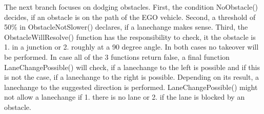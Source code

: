 The next branch focuses on dodging obstacles. First, the condition NoObstacle() decides, if an obstacle is on the path of the EGO vehicle. Second, a threshold of 50\% in ObstacleNotSlower() declares, if a lanechange makes sense. Third, the ObstacleWillResolve() function has the responsibility to check, it the obstacle is 1. in a junction or 2. roughly at a 90 degree angle. In both cases no takeover will be performed. In case all of the 3 functions return false, a final function LaneChangePossible() will check, if a lanechange to the left is possible and if this is not the case, if a lanechange to the right is possible. Depending on its result, a lanechange to the suggested direction is performed. LaneChangePossible() might not allow a lanechange if 1. there is no lane or 2. if the lane is blocked by an obstacle.


